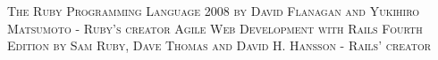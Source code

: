 \begin{thebibliography}{9}
 \textsc {The Ruby Programming Language 2008 by David Flanagan and Yukihiro Matsumoto - Ruby’s creator
}
 \textsc {Agile Web Development with Rails Fourth Edition by Sam Ruby, Dave Thomas and David H. Hansson - Rails’ creator
}
\end{thebibliography}